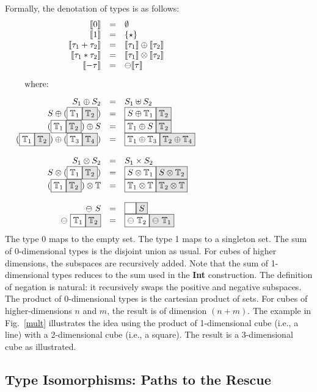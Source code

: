\documentclass[authoryear,preprint]{sigplanconf}
\newcommand{\cubt}{\mathbb{T}}
\newcommand{\den}[1]{\llbracket #1 \rrbracket}
\newcommand{\nodet}[2]{\fcolorbox{black}{white}{$#1$}\fcolorbox{black}{gray!20}{$#2$}}
\begin{document}
Formally, the denotation of types is as follows:
\[\begin{array}{rcl}
\den{0} &=& \emptyset \\
\den{1} &=& \{ \star \} \\
\den{\tau_1 + \tau_2} &=& \den{\tau_1} \oplus \den{\tau_2} \\
\den{\tau_1 * \tau_2} &=& \den{\tau_1} \otimes \den{\tau_2} \\
\den{- \tau} &=& \ominus \den{\tau} \\
\\
\noalign{\mbox{where:}\hfill}
\\
S_1 \oplus S_2 &=& S_1 \uplus S_2 \\
S \oplus (\nodet{\cubt_1}{\cubt_2}) &=& \nodet{S \oplus \cubt_1}{\cubt_2} \\
(\nodet{\cubt_1}{\cubt_2}) \oplus S &=& \nodet{\cubt_1 \oplus S}{\cubt_2} \\
(\nodet{\cubt_1}{\cubt_2}) \oplus (\nodet{\cubt_3}{\cubt_4}) &=& 
  \nodet{\cubt_1 \oplus \cubt_3}{\cubt_2 \oplus \cubt_4} \\
\\
S_1 \otimes S_2 &=& S_1 \times S_2 \\
S \otimes (\nodet{\cubt_1}{\cubt_2}) &=& 
  \nodet{S \otimes \cubt_1}{S \otimes \cubt_2} \\
(\nodet{\cubt_1}{\cubt_2}) \otimes \cubt &=& 
  \nodet{\cubt_1 \otimes \cubt}{\cubt_2 \otimes \cubt} \\
\\
\ominus~S &=& \nodet{\phantom{S}}{S} \\
\ominus~\nodet{\cubt_1}{\cubt_2} &=& \nodet{\ominus~\cubt_2}{\ominus~\cubt_1} 
\end{array}\]
The type 0 maps to the empty set. The type 1 maps to a singleton set. The sum
of $0$-dimensional types is the disjoint union as usual. For cubes of higher
dimensions, the subspaces are recursively added. Note that the sum of
1-dimensional types reduces to the sum used in the \textbf{Int} construction.
The definition of negation is natural: it recursively swaps the positive and
negative subspaces. The product of 0-dimensional types is the cartesian
product of sets. For cubes of higher-dimensions $n$ and $m$, the result is of
dimension $(n+m)$. The example in Fig.~\ref{mult} illustrates the idea using
the product of 1-dimensional cube (i.e., a line) with a 2-dimensional cube
(i.e., a square). The result is a 3-dimensional cube as illustrated.

\subsection{Type Isomorphisms: Paths to the Rescue}
\end{document}
